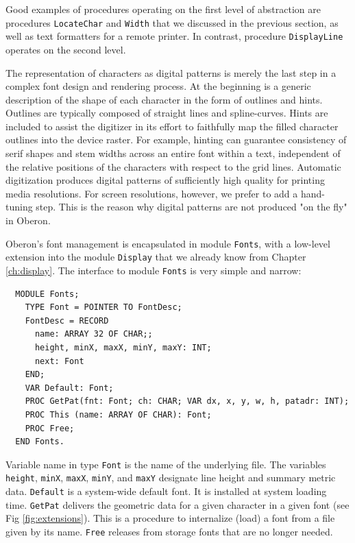 Good examples of procedures operating on the first level of abstraction are procedures \verb|LocateChar|
and \verb|Width| that we discussed in the previous section, as well as text formatters for a remote
printer.  In contrast, procedure \verb|DisplayLine| operates on the second level.

The representation of characters as digital patterns is merely the last step in a complex font design
and rendering process. At the beginning is a generic description of the shape of each character in
the form of outlines and hints. Outlines are typically composed of straight lines and spline-curves.
Hints are included to assist the digitizer in its effort to faithfully map the filled character outlines
into the device raster. For example, hinting can guarantee consistency of serif shapes and stem widths
across an entire font within a text, independent of the relative positions of the characters with
respect to the grid lines. Automatic digitization produces digital patterns of sufficiently high quality
for printing media resolutions. For screen resolutions, however, we prefer to add a hand-tuning
step. This is the reason why digital patterns are not produced "on the fly" in Oberon.

Oberon's font management is encapsulated in module \verb|Fonts|, with a low-level extension into the
module \verb|Display| that we already know from Chapter \ref{ch:display}. The interface to module
\verb|Fonts| is very simple and narrow:

\begin{verbatim}
  MODULE Fonts;
    TYPE Font = POINTER TO FontDesc;
    FontDesc = RECORD
      name: ARRAY 32 OF CHAR;;
      height, minX, maxX, minY, maxY: INT;
      next: Font
    END;
    VAR Default: Font;
    PROC GetPat(fnt: Font; ch: CHAR; VAR dx, x, y, w, h, patadr: INT);
    PROC This (name: ARRAY OF CHAR): Font;
    PROC Free;
  END Fonts.
\end{verbatim}

Variable name in type \verb|Font| is the name of the underlying file. The variables \verb|height|,
\verb|minX|, \verb|maxX|, \verb|minY|, and \verb|maxY| designate line height and summary metric data.
\verb|Default| is a system-wide default font. It is installed at system loading time. \verb|GetPat|
delivers the geometric data for a given character in a given font (see Fig \ref{fig:extensions}).
This is a procedure to internalize (load) a font from a file given by its name. \verb|Free| releases
from storage fonts that are no longer needed.

